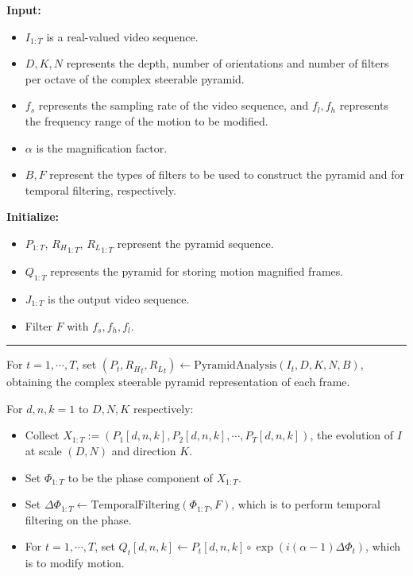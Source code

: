 \documentclass[aspectratio=43]{beamer}
\begin{document}
\begin{frame}[t]
\begin{multicols}{2}
{\begin{minipage}{0.95\columnwidth}
\textbf{Input:}
\begin{itemize}
\item 
$I_{1:T}$ is a real-valued video sequence.
\item $D,K,N$ represents the depth, number of orientations and number of filters per octave of the complex steerable pyramid.
\item  $f_s$ represents the sampling rate of the video sequence, and $f_l,f_h$ represents the frequency range of the motion to be modified.
\item  $\alpha$ is the magnification factor.
\item  $B,F$ represent the types of filters to be used to construct the pyramid and for temporal filtering, respectively.
\end{itemize}

\vspace{0.3em}

\textbf{Initialize:}
\begin{itemize}
\item $P_{1:T}$, ${R_H}_{1:T}$, ${R_L}_{1:T}$ represent the pyramid sequence.
\item $Q_{1:T}$ represents the pyramid for storing motion magnified frames.
\item $J_{1:T}$ is the output video sequence.
\item Filter $F$ with $f_s,f_h,f_l$.
\end{itemize}

\begin{center}
  \noindent\rule{\textwidth}{2pt}
\end{center}

For $t=1,\cdots, T$, set $(P_t,{R_H}_t,{R_L}_t) \gets \text{PyramidAnalysis}(I_t,D,K,N,B)$, obtaining the complex steerable pyramid representation of each frame.
 
\vspace{0.3em}
 
For $d,n,k=1$ to $D,N,K$ respectively:
\begin{itemize}
\item Collect $X_{1:T} := (P_1[d,n,k],P_2[d,n,k],\cdots,P_T[d,n,k])$, the evolution of $I$ at scale $(D,N)$ and direction $K$.
\item Set $\Phi_{1:T}$ to be the phase component of $X_{1:T}$.
\item Set $\Delta\Phi_{1:T} \gets \text{TemporalFiltering}(\Phi_{1:T},F)$, which is to perform temporal filtering on the phase.
\item For $t=1,\cdots, T$, set $Q_t[d,n,k]\gets P_t[d,n,k] \circ \exp(i(\alpha-1)\Delta\Phi_t)$, which is to modify motion.
 \end{itemize}


\end{minipage}}
\end{multicols}
\end{frame}
\end{document}
